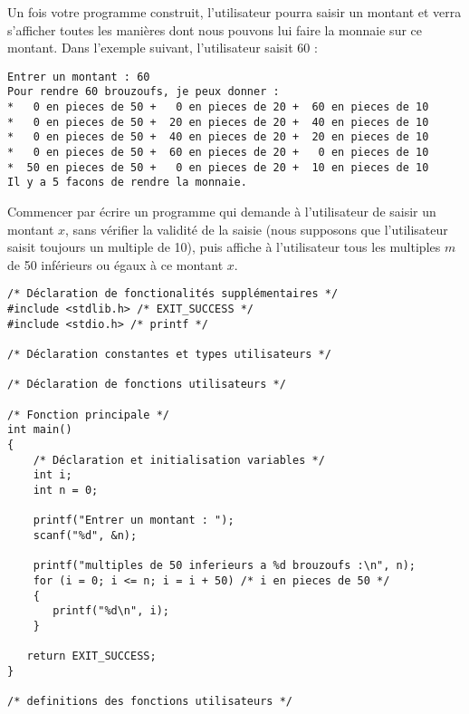 Un fois votre programme construit, l'utilisateur pourra saisir un
montant et verra s'afficher toutes les manières dont nous pouvons lui
faire la monnaie sur ce montant. Dans l'exemple suivant, l'utilisateur
saisit 60 :
\begin{center}
  \small
\begin{verbatim}
Entrer un montant : 60
Pour rendre 60 brouzoufs, je peux donner :
*   0 en pieces de 50 +   0 en pieces de 20 +  60 en pieces de 10
*   0 en pieces de 50 +  20 en pieces de 20 +  40 en pieces de 10
*   0 en pieces de 50 +  40 en pieces de 20 +  20 en pieces de 10
*   0 en pieces de 50 +  60 en pieces de 20 +   0 en pieces de 10
*  50 en pieces de 50 +   0 en pieces de 20 +  10 en pieces de 10
Il y a 5 facons de rendre la monnaie.
\end{verbatim}
\end{center}

\question Commencer par écrire un programme qui demande à
l'utilisateur de saisir un montant $x$, sans vérifier la validité de
la saisie (nous supposons que l'utilisateur saisit toujours un
multiple de 10), puis affiche à
l'utilisateur tous les multiples $m$ de 50 inférieurs ou égaux à ce
montant $x$.

\begin{correction}
  \begin{small}
\begin{verbatim}
/* Déclaration de fonctionalités supplémentaires */
#include <stdlib.h> /* EXIT_SUCCESS */
#include <stdio.h> /* printf */

/* Déclaration constantes et types utilisateurs */

/* Déclaration de fonctions utilisateurs */

/* Fonction principale */
int main()
{
    /* Déclaration et initialisation variables */
    int i;
    int n = 0;

    printf("Entrer un montant : ");
    scanf("%d", &n);

    printf("multiples de 50 inferieurs a %d brouzoufs :\n", n);
    for (i = 0; i <= n; i = i + 50) /* i en pieces de 50 */
    {
       printf("%d\n", i);
    }
 
   return EXIT_SUCCESS;
}

/* definitions des fonctions utilisateurs */
\end{verbatim}
\end{small}
\end{correction}


